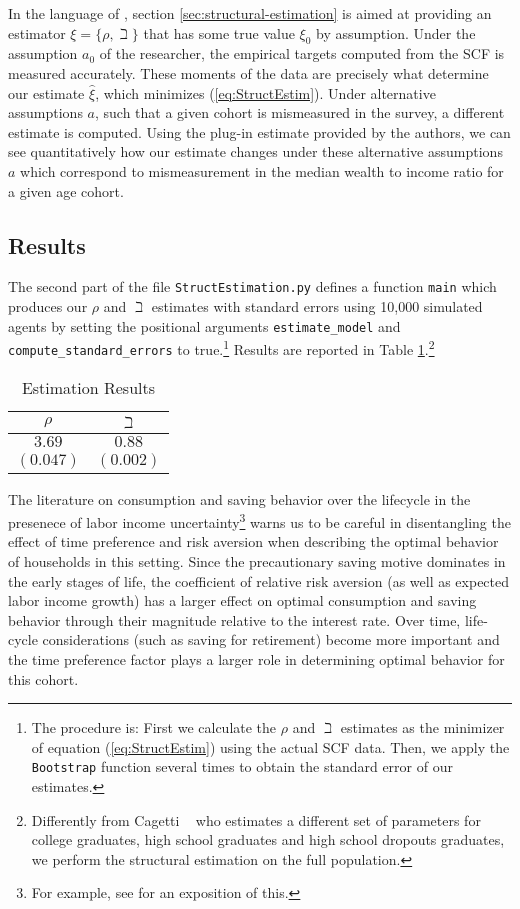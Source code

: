 In the language of \cite{andrews2017measuring}, section \ref{sec:structural-estimation} is aimed at providing an estimator $\xi =\{\rho ,{\beth}\}$ that has some true value $\xi_0 $ by assumption. Under the assumption $a_0$ of the researcher, the empirical targets computed from the SCF is measured accurately. These moments of the data are precisely what determine our estimate $\hat{\xi}$, which minimizes (\ref{eq:StructEstim}). Under alternative assumptions $a$, such that a given cohort is mismeasured in the survey, a different estimate is computed. Using the plug-in estimate provided by the authors, we can see quantitatively how our estimate changes under these alternative assumptions $a$ which correspond to mismeasurement in the median wealth to income ratio for a given age cohort.

\subsection{Results}
The second part of the file \texttt{StructEstimation.py}
defines a function \texttt{main} which produces our $\rho$ and
${\beth}$ estimates with standard errors using 10,000 simulated
agents by setting the positional arguments \texttt{estimate\_model} and
\texttt{compute\_standard\_errors} to true.\footnote{The procedure is: First we calculate the $\rho$ and
  ${\beth}$ estimates as the minimizer of equation
  (\ref{eq:StructEstim}) using the actual SCF data. Then, we apply the
  \texttt{Bootstrap} function several times to obtain the standard
  error of our estimates.} Results are reported in Table
\ref{tab:EstResults}.\footnote{Differently from Cagetti
  ~\citeyearpar{cagettiWprofiles} who estimates a different set of
  parameters for college graduates, high school graduates and high
  school dropouts graduates, we perform the structural estimation on
  the full population.}


  \begin{table}[h]
    \caption{Estimation Results}\label{tab:EstResults}
    \center
    \begin{tabular}{cc}
      \hline
      $\rho $ & ${\beth}$\\
      \hline
      $3.69$ & $0.88$\\
      $(0.047)$ & $(0.002)$\\
      \hline
    \end{tabular}
  \end{table}

The literature on consumption and saving behavior over the lifecycle in the presenece of labor income uncertainty\footnote{For example, see \cite{gpLifecycle} for an exposition of this.} warns us to be careful in disentangling the effect of time preference and risk aversion when describing the optimal behavior of households in this setting.  Since the precautionary saving motive dominates in the early stages of life, the coefficient of relative risk aversion (as well as expected labor income growth) has a larger effect on optimal consumption and saving behavior through their magnitude relative to the interest rate. Over time, life-cycle considerations (such as saving for retirement) become more important and the time preference factor plays a larger role in determining optimal behavior for this cohort.

